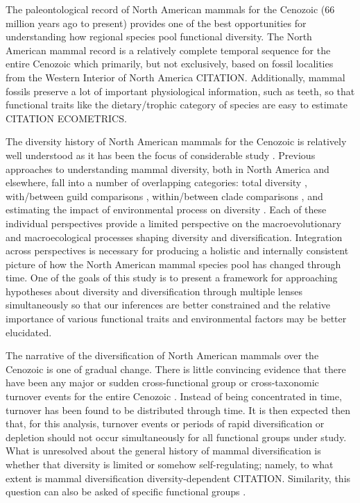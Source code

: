 \documentclass[12pt,letterpaper]{article}
\begin{document}
The paleontological record of North American mammals for the Cenozoic (66 million years ago to present) provides one of the best opportunities for understanding how regional species pool functional diversity. The North American mammal record is a relatively complete temporal sequence for the entire Cenozoic which primarily, but not exclusively, based on fossil localities from the Western Interior of North America CITATION. Additionally, mammal fossils preserve a lot of important physiological information, such as teeth, so that functional traits like the dietary/trophic category of species are easy to estimate CITATION \uppercase{ecometrics}.


The diversity history of North American mammals for the Cenozoic is relatively well understood as it has been the focus of considerable study \citep{Alroy2009,Alroy1996a,Janis1993b,Alroy2000g,Figeuirido2012,Pires2015a,Fraser2015,Smits2015a,Quental2013,Slater2015c,Silvestro2015b,Bedgley2013,Blois2009,Janis1993c}. Previous approaches to understanding mammal diversity, both in North America and elsewhere, fall into a number of overlapping categories: total diversity \citep{Alroy2000g,Alroy1996a,Figueirido2012,Liow2008}, with/between guild comparisons \citep{Janis2004,Janis2000,Jernvall2004,Janis1993c,Pires2015a,Janis2008a}, within/between clade comparisons \citep{Quental2013,Slater2015c,Silvestro2015b,Fraser2015a,Cantalapiedra2017}, and estimating the impact of environmental process on diversity \citep{Blois2009,Janis1993c,Janis1993b,Fraser2015a,Eronen2015,Badgley2013,Badgley2017,Alroy2000g}. Each of these individual perspectives provide a limited perspective on the macroevolutionary and macroecological processes shaping diversity and diversification. Integration across perspectives is necessary for producing a holistic and internally consistent picture of how the North American mammal species pool has changed through time. One of the goals of this study is to present a framework for approaching hypotheses about diversity and diversification through multiple lenses simultaneously so that our inferences are better constrained and the relative importance of various functional traits and environmental factors may be better elucidated.

The narrative of the diversification of North American mammals over the Cenozoic is one of gradual change. There is little convincing evidence that there have been any major or sudden cross-functional group or cross-taxonomic turnover events for the entire Cenozoic \citep{Alroy2009,Alroy1996a,Eronen2015,Janis1993b,Alroy2000g}. Instead of being concentrated in time, turnover has been found to be distributed through time. It is then expected then that, for this analysis, turnover events or periods of rapid diversification or depletion should not occur simultaneously for all functional groups under study. What is unresolved about the general history of mammal diversification is whether that diversity is limited or somehow self-regulating; namely, to what extent is mammal diversification diversity-dependent \citep{Alroy2009,Rabsoky2015b,Harmon2015a} CITATION. Similarity, this question can also be asked of specific functional groups \citep{Jernvall2004,Valkenburgh1999,Silvestro2015b,Quental2013}.
\end{document}
